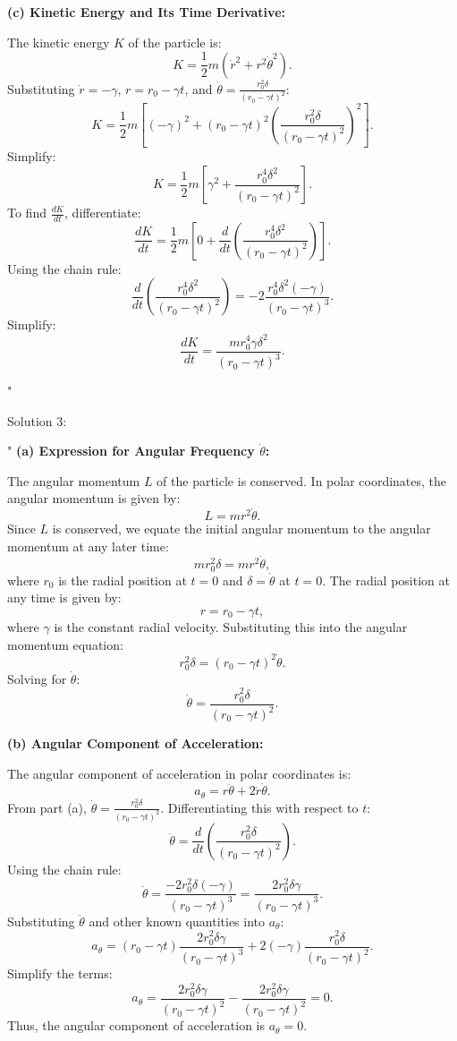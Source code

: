 \textbf{(c) Kinetic Energy and Its Time Derivative:}

The kinetic energy \( K \) of the particle is:
\[
K = \frac{1}{2} m \left( \dot{r}^2 + r^2 \dot{\theta}^2 \right).
\]
Substituting \( \dot{r} = -\gamma \), \( r = r_0 - \gamma t \), and \( \dot{\theta} = \frac{r_0^2 \delta}{(r_0 - \gamma t)^2} \):
\[
K = \frac{1}{2} m \left[ (-\gamma)^2 + (r_0 - \gamma t)^2 \left( \frac{r_0^2 \delta}{(r_0 - \gamma t)^2} \right)^2 \right].
\]
Simplify:
\[
K = \frac{1}{2} m \left[ \gamma^2 + \frac{r_0^4 \delta^2}{(r_0 - \gamma t)^2} \right].
\]
To find \( \frac{dK}{dt} \), differentiate:
\[
\frac{dK}{dt} = \frac{1}{2} m \left[ 0 + \frac{d}{dt} \left( \frac{r_0^4 \delta^2}{(r_0 - \gamma t)^2} \right) \right].
\]
Using the chain rule:
\[
\frac{d}{dt} \left( \frac{r_0^4 \delta^2}{(r_0 - \gamma t)^2} \right) = -2 \frac{r_0^4 \delta^2 (-\gamma)}{(r_0 - \gamma t)^3}.
\]
Simplify:
\[
\frac{dK}{dt} = \frac{m r_0^4 \gamma \delta^2}{(r_0 - \gamma t)^3}.
\]

"

Solution 3:

"
\textbf{(a) Expression for Angular Frequency \( \dot{\theta} \):}

The angular momentum \( L \) of the particle is conserved. In polar coordinates, the angular momentum is given by:
\[
L = m r^2 \dot{\theta}.
\]
Since \( L \) is conserved, we equate the initial angular momentum to the angular momentum at any later time:
\[
m r_0^2 \delta = m r^2 \dot{\theta},
\]
where \( r_0 \) is the radial position at \( t = 0 \) and \( \delta = \dot{\theta} \) at \( t = 0 \). The radial position at any time is given by:
\[
r = r_0 - \gamma t,
\]
where \( \gamma \) is the constant radial velocity. Substituting this into the angular momentum equation:
\[
r_0^2 \delta = (r_0 - \gamma t)^2 \dot{\theta}.
\]
Solving for \( \dot{\theta} \):
\[
\dot{\theta} = \frac{r_0^2 \delta}{(r_0 - \gamma t)^2}.
\]

\textbf{(b) Angular Component of Acceleration:}

The angular component of acceleration in polar coordinates is:
\[
a_\theta = r \ddot{\theta} + 2 \dot{r} \dot{\theta}.
\]
From part (a), \( \dot{\theta} = \frac{r_0^2 \delta}{(r_0 - \gamma t)^2} \). Differentiating this with respect to \( t \):
\[
\ddot{\theta} = \frac{d}{dt} \left( \frac{r_0^2 \delta}{(r_0 - \gamma t)^2} \right).
\]
Using the chain rule:
\[
\ddot{\theta} = \frac{-2 r_0^2 \delta (-\gamma)}{(r_0 - \gamma t)^3} = \frac{2 r_0^2 \delta \gamma}{(r_0 - \gamma t)^3}.
\]
Substituting \( \ddot{\theta} \) and other known quantities into \( a_\theta \):
\[
a_\theta = (r_0 - \gamma t) \frac{2 r_0^2 \delta \gamma}{(r_0 - \gamma t)^3} + 2(-\gamma) \frac{r_0^2 \delta}{(r_0 - \gamma t)^2}.
\]
Simplify the terms:
\[
a_\theta = \frac{2 r_0^2 \delta \gamma}{(r_0 - \gamma t)^2} - \frac{2 r_0^2 \delta \gamma}{(r_0 - \gamma t)^2} = 0.
\]
Thus, the angular component of acceleration is \( a_\theta = 0 \).

